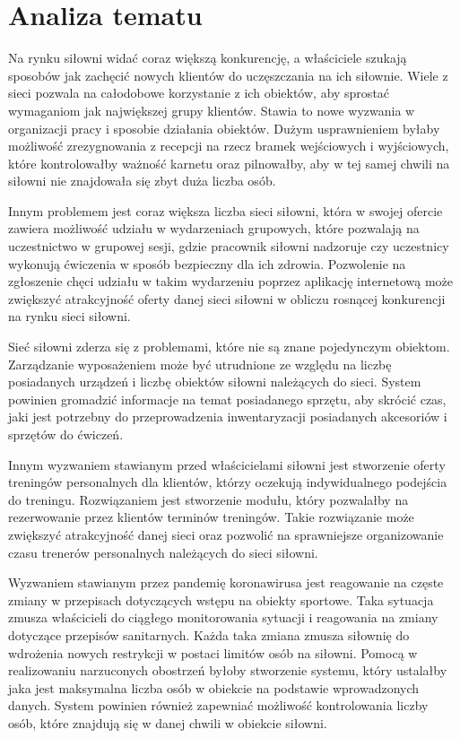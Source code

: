 \documentclass[a4paper,twoside,12pt]{book}
\begin{document}
{\chapter{Analiza tematu}
Na rynku siłowni widać coraz większą konkurencję, a właściciele szukają sposobów jak zachęcić nowych klientów do uczęszczania na ich siłownie. Wiele z sieci pozwala na całodobowe korzystanie z ich obiektów, aby sprostać wymaganiom jak największej grupy klientów. Stawia to nowe wyzwania w organizacji pracy i sposobie działania obiektów. Dużym usprawnieniem byłaby możliwość zrezygnowania z recepcji na rzecz bramek wejściowych i wyjściowych, które kontrolowałby ważność karnetu oraz pilnowałby, aby w tej samej chwili na siłowni nie znajdowała się zbyt duża liczba osób.

Innym problemem jest coraz większa liczba sieci siłowni, która w swojej ofercie zawiera możliwość udziału w wydarzeniach grupowych, które pozwalają na uczestnictwo w grupowej sesji, gdzie pracownik siłowni nadzoruje czy uczestnicy wykonują ćwiczenia w sposób bezpieczny dla ich zdrowia. Pozwolenie na zgłoszenie chęci udziału w takim wydarzeniu poprzez aplikację internetową może zwiększyć atrakcyjność oferty danej sieci siłowni w obliczu rosnącej konkurencji na rynku sieci siłowni.

Sieć siłowni zderza się z problemami, które nie są znane pojedynczym obiektom. Zarządzanie wyposażeniem może być utrudnione ze względu na liczbę posiadanych urządzeń i liczbę obiektów siłowni należących do sieci. System powinien gromadzić informacje na temat posiadanego sprzętu, aby skrócić czas, jaki jest potrzebny do przeprowadzenia inwentaryzacji posiadanych akcesoriów i sprzętów do ćwiczeń.

Innym wyzwaniem stawianym przed właścicielami siłowni jest stworzenie oferty treningów personalnych dla klientów, którzy oczekują indywidualnego podejścia do treningu. Rozwiązaniem jest stworzenie modułu, który pozwalałby na rezerwowanie przez klientów terminów treningów. Takie rozwiązanie może zwiększyć atrakcyjność danej sieci oraz pozwolić na sprawniejsze organizowanie czasu trenerów personalnych należących do sieci siłowni.

Wyzwaniem stawianym przez pandemię koronawirusa jest reagowanie na częste zmiany w przepisach dotyczących wstępu na obiekty sportowe. Taka sytuacja zmusza właścicieli do ciągłego monitorowania sytuacji i reagowania na zmiany dotyczące przepisów sanitarnych. Każda taka zmiana zmusza siłownię do wdrożenia nowych restrykcji w postaci limitów osób na siłowni. Pomocą w realizowaniu narzuconych obostrzeń byłoby stworzenie systemu, który ustalałby jaka jest maksymalna liczba osób w obiekcie na podstawie wprowadzonych danych. System powinien również zapewniać możliwość kontrolowania liczby osób, które znajdują się w danej chwili w obiekcie siłowni.

}
\end{document}

